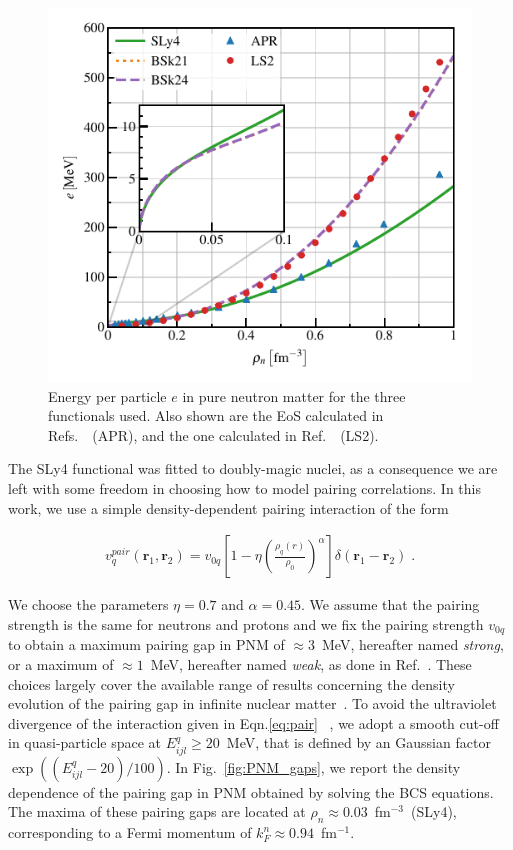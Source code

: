 \documentclass[
    amsmath,amssymb,
    aps,
    prc,
    floatfix,
]{revtex4-2}
\begin{document}
    \begin{figure}
        \centering
        \includegraphics{figs/PNM_e.pdf}
        \caption{Energy per particle $e$ in pure neutron matter for the three functionals used. Also shown are the EoS calculated in Refs.~\cite{wiringaEquationStateDense1988,wiringaDeuteronsNeutronStars1993}~(APR), and the one calculated in Ref.~\cite{liNeutronStarStructure2008}~(LS2).}
        \label{fig:PNM_rho}
    \end{figure}
    
The SLy4 functional was fitted to doubly-magic nuclei, as a consequence we are left with some freedom in choosing how to model pairing correlations.
In this work, we use a simple density-dependent pairing interaction of the form~\cite{bertsch1991pair}

    \begin{eqnarray}\label{eq:pair}
        v^{pair}_q(\mathbf{r}_1,\mathbf{r}_2)=v_{0q}\left[1-\eta \left(\frac{\rho_q(r)}{\rho_0}\right)^\alpha\right]\delta\left(\mathbf{r}_1-\mathbf{r}_2\right)\;.
    \end{eqnarray}

\noindent We choose the parameters $\eta=0.7$ and $\alpha=0.45$. We assume that the pairing strength is the same for neutrons and protons and we fix the pairing strength $v_{0q}$ to obtain a maximum pairing gap in PNM of $\approx3$~MeV, hereafter named \emph{strong}, or a maximum of $\approx1$~MeV, hereafter named \emph{weak}, as done in Ref.~\cite{grill2011cluster}. These choices largely cover the available range of results concerning the density evolution of the pairing gap in infinite nuclear matter~\cite{gandolfi2008equation}.
To avoid the ultraviolet divergence of the interaction given in Eqn.\ref{eq:pair} ~\cite{bulgac2002renormalization}, we adopt a smooth cut-off in quasi-particle space at $E_{ijl}^q\ge20$~MeV, that is defined by an Gaussian factor $\exp\left(\left(E_{ijl}^q-20\right)/100\right)$.
In Fig.~\ref{fig:PNM_gaps}, we report the density dependence of the pairing gap in PNM obtained by solving the BCS equations. The maxima of these pairing gaps are located at $\rho_n\approx0.03$~fm$^{-3}$~(SLy4), corresponding to a Fermi momentum of $k_F^n\approx0.94$~fm$^{-1}$.
\end{document}
